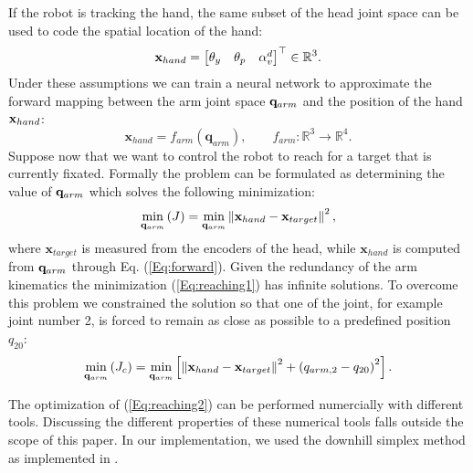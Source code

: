 If the robot is tracking the hand, the same subset of the head joint space can be used to code the spatial location of the hand:
%
\begin{eqnarray*}
\mathbf{x}_{hand}=
\begin{bmatrix} \theta_y & \theta_p & \alpha_v^d\end{bmatrix}^\top \in \mathbb R^3.
\end{eqnarray*}
%
Under these assumptions we can train a neural network to approximate the 
forward mapping between the arm joint space $\mathbf q_{arm}$ and the 
position of the hand $\mathbf{x}_{hand}$:
%
\begin{equation} 
\label{Eq:forward}
\mathbf x_{hand}=f_{arm}(\mathbf q_{arm}), \qquad f_{arm} : \mathbb R^3 \longrightarrow \mathbb R^4.\end{equation}
%
Suppose now that we want to control the robot to reach for a target 
that is currently fixated. Formally the problem can be formulated 
as determining the value of $\mathbf q_{arm}$ which solves the 
following minimization:
%
\begin{equation} 
\label{Eq:reaching1}
  \displaystyle\min_{\mathbf q_{arm}} \left(J\right)=\displaystyle\min_{\mathbf q_{arm}}
  \left\|\mathbf x_{hand} - \mathbf x_{target}\right\|^2,
\end{equation}
%
where $\mathbf x_{target}$ is measured from the encoders of the head, while 
$\mathbf x_{hand}$ is computed from $\mathbf q_{arm}$ through Eq. (\ref{Eq:forward}). 
Given the redundancy of the arm kinematics the minimization 
(\ref{Eq:reaching1}) has infinite solutions. To 
overcome this problem we constrained the solution so that one of the joint, 
for example joint number 2, is forced to remain as close as possible to 
a predefined position $q_{20}$:
%
\begin{equation} 
\label{Eq:reaching2}
  \displaystyle\min_{\mathbf q_{arm}}\left(J_c\right)=\displaystyle\min_{\mathbf q_{arm}}
  \left[
  \left\|\mathbf x_{hand} - \mathbf x_{target}\right\|^2 + \left(q_{arm,2}-q_{20}\right)^2
  \right].
\end{equation}

The optimization of (\ref{Eq:reaching2}) can be performed numercially with 
different tools. Discussing the different properties of these numerical 
tools falls outside the scope of this paper. In our implementation, we used 
the downhill simplex method \cite{ne:Computer:65} as implemented in 
\cite{mo:Press:90}.

